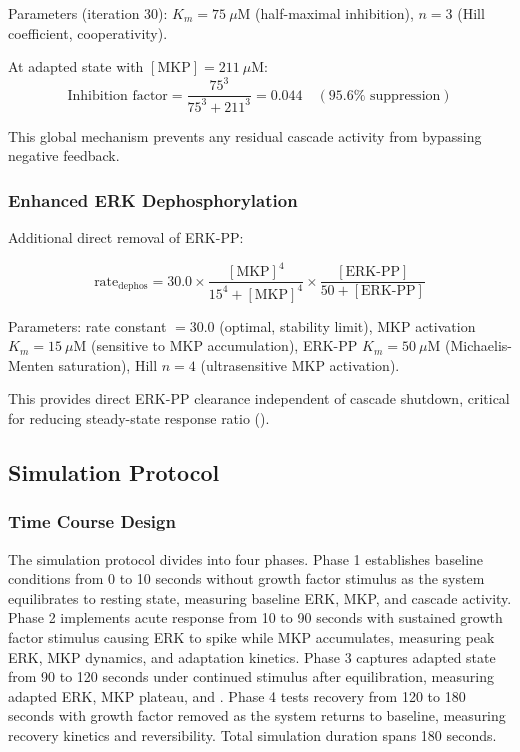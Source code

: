 \documentclass[twocolumn,11pt]{article}
\newcommand{\erk}{ERK}
\newcommand{\mkp}{MKP}
\newcommand{\srr}{\text{SRR}}
\begin{document}
Parameters (iteration 30): $K_m = 75~\mu$M (half-maximal inhibition), $n = 3$ (Hill coefficient, cooperativity).

At adapted state with $[\text{MKP}] = 211~\mu$M:
\begin{equation}
\text{Inhibition factor} = \frac{75^3}{75^3 + 211^3} = 0.044 \quad (95.6\% \text{ suppression})
\end{equation}

This global mechanism prevents any residual cascade activity from bypassing negative feedback.

\subsubsection{Enhanced \erk{} Dephosphorylation}

Additional direct removal of \erk{}-PP:

\begin{equation}
\text{rate}_{\text{dephos}} = 30.0 \times \frac{[\text{MKP}]^4}{15^4 + [\text{MKP}]^4} \times \frac{[\text{ERK-PP}]}{50 + [\text{ERK-PP}]}
\end{equation}

Parameters: rate constant $= 30.0$ (optimal, stability limit), \mkp{} activation $K_m = 15~\mu$M (sensitive to \mkp{} accumulation), \erk{}-PP $K_m = 50~\mu$M (Michaelis-Menten saturation), Hill $n = 4$ (ultrasensitive \mkp{} activation).

This provides direct \erk{}-PP clearance independent of cascade shutdown, critical for reducing steady-state response ratio (\srr{}).

\subsection{Simulation Protocol}

\subsubsection{Time Course Design}

The simulation protocol divides into four phases. Phase 1 establishes baseline conditions from 0 to 10 seconds without growth factor stimulus as the system equilibrates to resting state, measuring baseline \erk{}, \mkp{}, and cascade activity. Phase 2 implements acute response from 10 to 90 seconds with sustained growth factor stimulus causing \erk{} to spike while \mkp{} accumulates, measuring peak \erk{}, \mkp{} dynamics, and adaptation kinetics. Phase 3 captures adapted state from 90 to 120 seconds under continued stimulus after equilibration, measuring adapted \erk{}, \mkp{} plateau, and \srr{}. Phase 4 tests recovery from 120 to 180 seconds with growth factor removed as the system returns to baseline, measuring recovery kinetics and reversibility. Total simulation duration spans 180 seconds.
\end{document}
